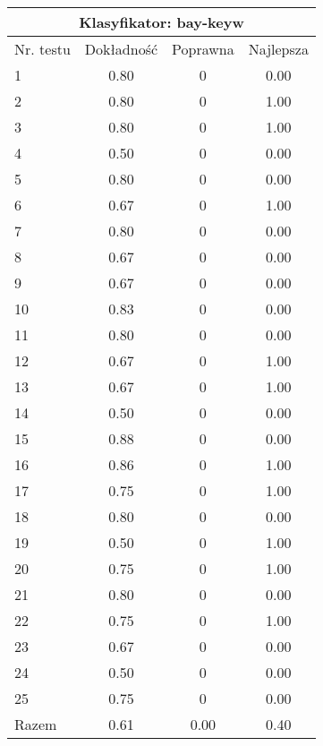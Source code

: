 \begin{tabular}{|l|c|c|c|}
\hline
\multicolumn{4}{|c|}{Klasyfikator: bay-keyw}\\
\hline
Nr. testu & Dokładność & Poprawna & Najlepsza\\
\hline
1 & 0.80 & 0 & 0.00 \\
2 & 0.80 & 0 & 1.00 \\
3 & 0.80 & 0 & 1.00 \\
4 & 0.50 & 0 & 0.00 \\
5 & 0.80 & 0 & 0.00 \\
6 & 0.67 & 0 & 1.00 \\
7 & 0.80 & 0 & 0.00 \\
8 & 0.67 & 0 & 0.00 \\
9 & 0.67 & 0 & 0.00 \\
10 & 0.83 & 0 & 0.00 \\
11 & 0.80 & 0 & 0.00 \\
12 & 0.67 & 0 & 1.00 \\
13 & 0.67 & 0 & 1.00 \\
14 & 0.50 & 0 & 0.00 \\
15 & 0.88 & 0 & 0.00 \\
16 & 0.86 & 0 & 1.00 \\
17 & 0.75 & 0 & 1.00 \\
18 & 0.80 & 0 & 0.00 \\
19 & 0.50 & 0 & 1.00 \\
20 & 0.75 & 0 & 1.00 \\
21 & 0.80 & 0 & 0.00 \\
22 & 0.75 & 0 & 1.00 \\
23 & 0.67 & 0 & 0.00 \\
24 & 0.50 & 0 & 0.00 \\
25 & 0.75 & 0 & 0.00 \\
\hline
Razem & 0.61 & 0.00 & 0.40 \\
\hline
\end{tabular}
